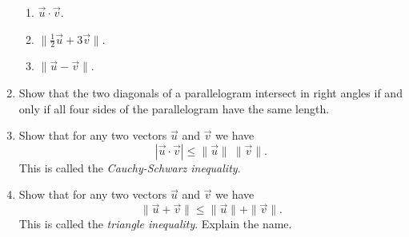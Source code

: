 \begin{enumerate}
\begin{enumerate}
\item  $\vec{u} \cdot \vec{v}$.

\item  $\| \frac{1}{2} \vec{u} + 3\vec{v} \|$.

\item  $\| \vec{u} - \vec{v} \|$.\\
\end{enumerate}

\item  Show that the two diagonals of a parallelogram intersect in right angles if and only if all four sides of the parallelogram have the same length. \\

\item  Show that for any two vectors $\vec{u}$ and $\vec{v}$ we have
\[
| \vec{u} \cdot \vec{v} | \leq \| \vec{u} \| \ \| \vec{v} \|.
\] 
This is called the \emph{Cauchy-Schwarz inequality}.  \\

\item  Show that for any two vectors $\vec{u}$ and $\vec{v}$ we have
\[
\| \vec{u} + \vec{v} \| \leq \| \vec{u} \| + \| \vec{v} \|.
\] 
This is called the \emph{triangle inequality}.  Explain the name.  \\


\end{enumerate}


